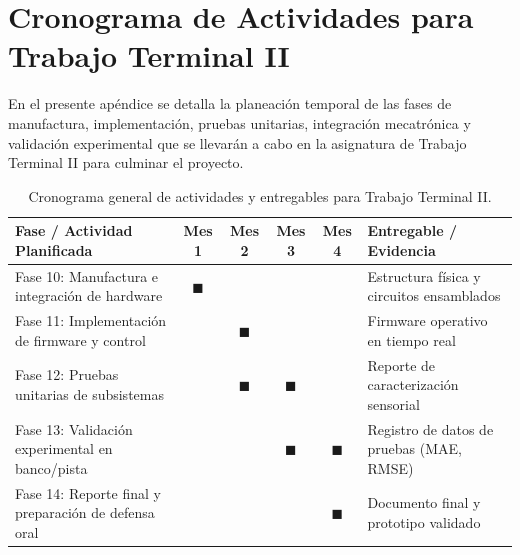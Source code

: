 
\chapter{Cronograma de Actividades para Trabajo Terminal II}
\label{ap:cronograma-tt2}

En el presente apéndice se detalla la planeación temporal de las fases de manufactura, implementación, pruebas unitarias, integración mecatrónica y validación experimental que se llevarán a cabo en la asignatura de Trabajo Terminal II para culminar el proyecto.

\begin{table}[htbp]
    \centering
    \caption{Cronograma general de actividades y entregables para Trabajo Terminal II.}
    \label{tab:cronograma-tt2}
    \begin{tabularx}{\textwidth}{J{4.8cm} c c c c Y}
        \toprule
        \textbf{Fase / Actividad Planificada} & \textbf{Mes 1} & \textbf{Mes 2} & \textbf{Mes 3} & \textbf{Mes 4} & \textbf{Entregable / Evidencia} \\
        \midrule
        Fase 10: Manufactura e integración de hardware & $\blacksquare$ & & & & Estructura física y circuitos ensamblados \\
        Fase 11: Implementación de firmware y control & & $\blacksquare$ & & & Firmware operativo en tiempo real \\
        Fase 12: Pruebas unitarias de subsistemas & & $\blacksquare$ & $\blacksquare$ & & Reporte de caracterización sensorial \\
        Fase 13: Validación experimental en banco/pista & & & $\blacksquare$ & $\blacksquare$ & Registro de datos de pruebas (MAE, RMSE) \\
        Fase 14: Reporte final y preparación de defensa oral & & & & $\blacksquare$ & Documento final y prototipo validado \\
        \bottomrule
    \end{tabularx}
\end{table}
